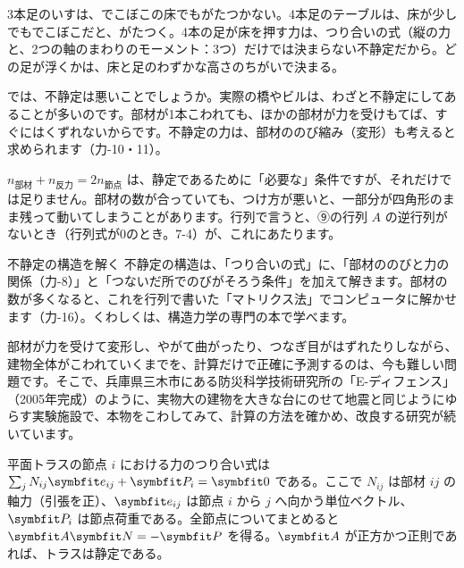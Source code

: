 \begin{phmijika}[3本足と4本足]
3本足のいすは、でこぼこの床でもがたつかない。4本足のテーブルは、床が少しでもでこぼこだと、がたつく。4本の足が床を押す力は、つり合いの式（縦の力と、2つの軸のまわりのモーメント：3つ）だけでは決まらない不静定だから。どの足が浮くかは、床と足のわずかな高さのちがいで決まる。
\end{phmijika}

\noindent では、不静定は悪いことでしょうか。実際の橋やビルは、わざと不静定にしてあることが多いのです。部材が1本こわれても、ほかの部材が力を受けもてば、すぐにはくずれないからです。不静定の力は、部材ののび縮み（変形）も考えると求められます（力-10・11）。

\begin{seikaku}
$n_{\text{部材}}+n_{\text{反力}}=2n_{\text{節点}}$ は、静定であるために「必要な」条件ですが、それだけでは足りません。部材の数が合っていても、つけ方が悪いと、一部分が四角形のまま残って動いてしまうことがあります。行列で言うと、⑨の行列 $A$ の逆行列がないとき（行列式が0のとき。7-4）が、これにあたります。
\end{seikaku}

\begin{phsaki}{不静定の構造を解く}
不静定の構造は、「つり合いの式」に、「部材ののびと力の関係（力-8）」と「つないだ所でのびがそろう条件」を加えて解きます。部材の数が多くなると、これを行列で書いた「マトリクス法」でコンピュータに解かせます（力-16）。くわしくは、構造力学の専門の本で学べます。
\end{phsaki}

\begin{phmada}[地震で建物がこわれていくようす]
部材が力を受けて変形し、やがて曲がったり、つなぎ目がはずれたりしながら、建物全体がこわれていくまでを、計算だけで正確に予測するのは、今も難しい問題です。そこで、兵庫県三木市にある防災科学技術研究所の「E-ディフェンス」（2005年完成）のように、実物大の建物を大きな台にのせて地震と同じようにゆらす実験施設で、本物をこわしてみて、計算の方法を確かめ、改良する研究が続いています。
\end{phmada}

\begin{senmonsho}[構造力学の書き方]
\begin{bkhonbun}
平面トラスの節点 $i$ における力のつり合い式は $\sum_j N_{ij}\symbfit e_{ij}+\symbfit P_i=\symbfit 0$ である。ここで $N_{ij}$ は部材 $ij$ の軸力（引張を正）、$\symbfit e_{ij}$ は節点 $i$ から $j$ へ向かう単位ベクトル、$\symbfit P_i$ は節点荷重である。全節点についてまとめると $\symbfit A\symbfit N=-\symbfit P$ を得る。$\symbfit A$ が正方かつ正則であれば、トラスは静定である。
\end{bkhonbun}
\end{senmonsho}

